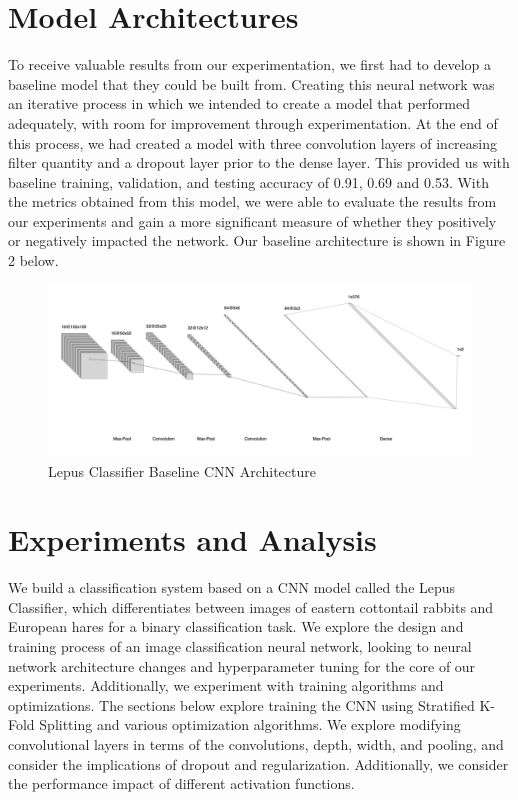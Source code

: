 \documentclass{article}
\begin{document}
\section{Model Architectures}
To receive valuable results from our experimentation, we first had to develop a baseline model that they could be built from. Creating this neural network was an iterative process in which we intended to create a model that performed adequately, with room for improvement through experimentation. At the end of this process, we had created a model with three convolution layers of increasing filter quantity and a dropout layer prior to the dense layer. This provided us with baseline training, validation, and testing accuracy of 0.91, 0.69 and 0.53. With the metrics obtained from this model, we were able to evaluate the results from our experiments and gain a more significant measure of whether they positively or negatively impacted the network. Our baseline architecture is shown in Figure 2 below.
\newline
\begin{figure}[h!]
    \centering
    \includegraphics[scale=0.65]{CNN.png}
    \caption{Lepus Classifier Baseline CNN Architecture}
    \label{fig:my_label}
\end{figure}


\section{Experiments and Analysis}
We build a classification system based on a CNN model called the Lepus Classifier, which differentiates between images of eastern cottontail rabbits and European hares for a binary classification task. We explore the design and training process of an image classification neural network, looking to neural network architecture changes and hyperparameter tuning for the core of our experiments. Additionally, we experiment with training algorithms and optimizations. The sections below explore training the CNN using Stratified K-Fold Splitting and various optimization algorithms. We explore modifying convolutional layers in terms of the convolutions, depth, width, and pooling, and consider the implications of dropout and regularization. Additionally, we consider the performance impact of different activation functions.  
\end{document}

